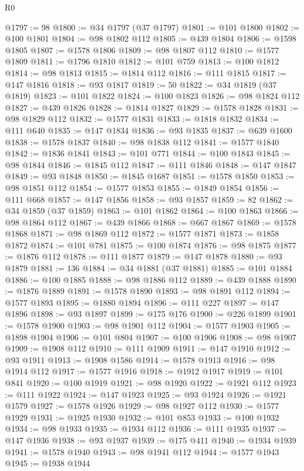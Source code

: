 \begin{lexlean}{R0}
\begin{coremodule}
@1797 := 98
@1800 := @34 @1797 (@37 @1797)
@1801 := @101 @1800
@1802 := @100 @1801
@1804 := @98 @1802 @112
@1805 := @439 @1804
@1806 := @1598 @1805
@1807 := @1578 @1806
@1809 := @98 @1807 @112
@1810 := @1577 @1809
@1811 := @1796 @1810
@1812 := @101 @759
@1813 := @100 @1812
@1814 := @98 @1813
@1815 := @1814 @112
@1816 := @111 @1815
@1817 := @147 @1816
@1818 := @93 @1817
@1819 := 50
@1822 := @34 @1819 (@37 @1819)
@1823 := @101 @1822
@1824 := @100 @1823
@1826 := @98 @1824 @112
@1827 := @439 @1826
@1828 := @1814 @1827
@1829 := @1578 @1828
@1831 := @98 @1829 @112
@1832 := @1577 @1831
@1833 := @1818 @1832
@1834 := @111 @640
@1835 := @147 @1834
@1836 := @93 @1835
@1837 := @639 @1600
@1838 := @1578 @1837
@1840 := @98 @1838 @112
@1841 := @1577 @1840
@1842 := @1836 @1841
@1843 := @101 @771
@1844 := @100 @1843
@1845 := @98 @1844
@1846 := @1845 @112
@1847 := @111 @1846
@1848 := @147 @1847
@1849 := @93 @1848
@1850 := @1845 @1687
@1851 := @1578 @1850
@1853 := @98 @1851 @112
@1854 := @1577 @1853
@1855 := @1849 @1854
@1856 := @111 @668
@1857 := @147 @1856
@1858 := @93 @1857
@1859 := 82
@1862 := @34 @1859 (@37 @1859)
@1863 := @101 @1862
@1864 := @100 @1863
@1866 := @98 @1864 @112
@1867 := @439 @1866
@1868 := @667 @1867
@1869 := @1578 @1868
@1871 := @98 @1869 @112
@1872 := @1577 @1871
@1873 := @1858 @1872
@1874 := @101 @781
@1875 := @100 @1874
@1876 := @98 @1875
@1877 := @1876 @112
@1878 := @111 @1877
@1879 := @147 @1878
@1880 := @93 @1879
@1881 := 136
@1884 := @34 @1881 (@37 @1881)
@1885 := @101 @1884
@1886 := @100 @1885
@1888 := @98 @1886 @112
@1889 := @439 @1888
@1890 := @1876 @1889
@1891 := @1578 @1890
@1893 := @98 @1891 @112
@1894 := @1577 @1893
@1895 := @1880 @1894
@1896 := @111 @227
@1897 := @147 @1896
@1898 := @93 @1897
@1899 := @175 @176
@1900 := @226 @1899
@1901 := @1578 @1900
@1903 := @98 @1901 @112
@1904 := @1577 @1903
@1905 := @1898 @1904
@1906 := @101 @804
@1907 := @100 @1906
@1908 := @98 @1907
@1909 := @1908 @112
@1910 := @111 @1909
@1911 := @147 @1910
@1912 := @93 @1911
@1913 := @1908 @1586
@1914 := @1578 @1913
@1916 := @98 @1914 @112
@1917 := @1577 @1916
@1918 := @1912 @1917
@1919 := @101 @841
@1920 := @100 @1919
@1921 := @98 @1920
@1922 := @1921 @112
@1923 := @111 @1922
@1924 := @147 @1923
@1925 := @93 @1924
@1926 := @1921 @1579
@1927 := @1578 @1926
@1929 := @98 @1927 @112
@1930 := @1577 @1929
@1931 := @1925 @1930
@1932 := @101 @853
@1933 := @100 @1932
@1934 := @98 @1933
@1935 := @1934 @112
@1936 := @111 @1935
@1937 := @147 @1936
@1938 := @93 @1937
@1939 := @175 @411
@1940 := @1934 @1939
@1941 := @1578 @1940
@1943 := @98 @1941 @112
@1944 := @1577 @1943
@1945 := @1938 @1944

\end{coremodule}
\end{lexlean}
